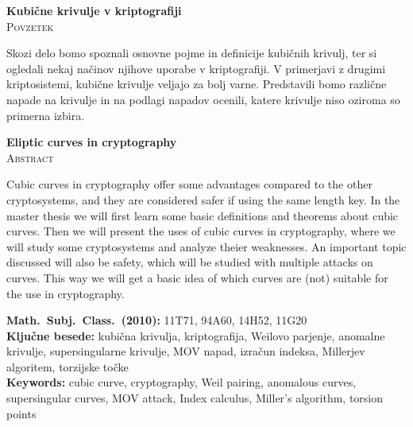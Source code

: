 \documentclass[12pt,a4paper,twoside]{article}
\newcommand{\naslovdela}{Kubične krivulje v kriptografiji}
\newcommand{\kljucnebesede}{kubična krivulja\sep kriptografija\sep Weilovo parjenje\sep anomalne krivulje\sep supersingularne krivulje\sep MOV napad\sep izračun indeksa\sep Millerjev algoritem\sep torzijske točke} %
\newcommand{\keywords}{cubic curve\sep cryptography\sep Weil pairing\sep anomalous curves\sep supersingular curves\sep MOV attack\sep Index calculus\sep Miller's algorithm\sep torsion points} %
\newcommand{\sep}{, }  %
\theoremstyle{definition} %
\theoremstyle{plain} %
\numberwithin{equation}{section}  %
\begin{document}

\cleardoublepage
{}

\begin{center}
\textbf{\naslovdela} \\[3mm]
\textsc{Povzetek} \\[2mm]
\end{center}
Skozi delo bomo spoznali osnovne pojme in definicije kubičnih krivulj, ter si ogledali nekaj načinov njihove uporabe v kriptografiji. V primerjavi z drugimi kriptosistemi, kubične krivulje veljajo za bolj varne. Predstavili bomo različne napade na krivulje in na podlagi napadov ocenili, katere krivulje niso oziroma so primerna izbira.

\vfill
\begin{center}
\textbf{Eliptic curves in cryptography} \\[3mm] %
\textsc{Abstract}\\[2mm]
\end{center}

Cubic curves in cryptography offer some advantages compared to the other cryptosystems, and they are considered safer if using the same length key. In the master thesis we will first learn some basic definitions and theorems about cubic curves. Then we will present the uses of cubic curves in cryptography, where we will study some cryptosystems and analyze theier weaknesses. An important topic discussed will also be safety, which will be studied with multiple attacks on curves. This way we will get a basic idea of which curves are (not) suitable for the use in cryptography.


\vfill\noindent
\textbf{Math.~Subj.~Class.~(2010):}	11T71, 94A60, 14H52, 11G20  \\[1mm]
\textbf{Ključne besede:} \kljucnebesede \\[1mm]
\textbf{Keywords:} \keywords

\cleardoublepage

\setcounter{page}{1}    %



\end{document}
